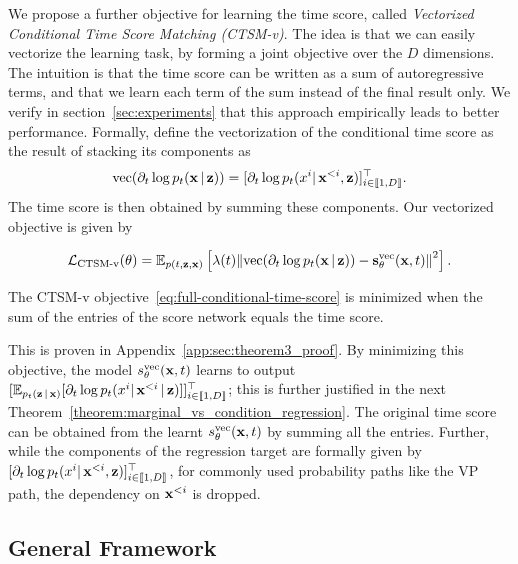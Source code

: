 We propose a further objective for learning the time score, called \textit{Vectorized Conditional Time Score Matching (CTSM-v)}. The idea is that we can easily vectorize the learning task, by forming a joint objective over the $D$ dimensions. The intuition is that the time score can be written as a sum of autoregressive terms, and that we learn each term of the sum instead of the final result only. We verify in section~\ref{sec:experiments} that this approach empirically leads to better performance.
Formally, define the vectorization of the conditional time score as the result of stacking its components as
\begin{equation}
\text{vec}(\partial_t \log p_t(\operatorname{\mathbf{x}} | \operatorname{\mathbf{z}})) = [\partial_t \log p_t(x^i | \operatorname{\mathbf{x}}^{<i}, \operatorname{\mathbf{z}})]_{i \in \llbracket 1, D \rrbracket}^\top.
\end{equation}
The time score is then obtained by summing these components. Our vectorized objective is given by

\begin{align}
\mathcal{L}_{\text{CTSM-v}}(\operatorname{\mathbf{\theta}})
= 
\mathbb{E}_{p(t, \operatorname{\mathbf{z}}, \operatorname{\mathbf{x}})}
\left[\lambda(t)\norm{\text{vec}(\partial_{t}\log p_{t}(\operatorname{\mathbf{x}}|\operatorname{\mathbf{z}})) - \operatorname{\mathbf{s}}^{\text{vec}}_{\operatorname{\mathbf{\theta}}}(\operatorname{\mathbf{x}},t)}^2\right].
\label{eq:full-conditional-time-score}
\end{align}

\begin{theorem}
    \label{theorem:ctsm_v_objective}
    The CTSM-v objective~\eqref{eq:full-conditional-time-score} is minimized when the sum of the entries of the score network equals the time score.
\end{theorem}
This is proven in Appendix~\ref{app:sec:theorem3_proof}. By minimizing this objective, the model $s_{\operatorname{\mathbf{\theta}}}^{\text{vec}}(\operatorname{\mathbf{x}}, t)$ learns to output $[\mathbb{E}_{p_t(\operatorname{\mathbf{z}} | \operatorname{\mathbf{x}})}[\partial_t \log p_t(x^i | \operatorname{\mathbf{x}}^{<i} | \operatorname{\mathbf{z}})]]_{i \in \llbracket1, D \rrbracket}^\top$; this is further justified in the next     Theorem~\ref{theorem:marginal_vs_condition_regression}. The original time score can be obtained from the learnt $s_{\operatorname{\mathbf{\theta}}}^{\text{vec}}(\operatorname{\mathbf{x}}, t)$ by summing all the entries. Further, while the components of the regression target are formally given by $[\partial_t \log p_t(x^i | \operatorname{\mathbf{x}}^{<i}, \operatorname{\mathbf{z}})]_{i \in \llbracket 1, D \rrbracket}^\top$, for commonly used probability paths like the VP path, the dependency on $\operatorname{\mathbf{x}}^{<i}$ is dropped.

\subsection{General Framework}

